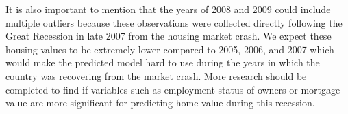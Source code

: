 It is also important to mention that the years of 2008 and 2009 could include multiple outliers because these observations were collected directly following the Great Recession in late 2007 from the housing market crash. We expect these housing values to be extremely lower compared to 2005, 2006, and 2007 which would make the predicted model hard to use during the years in which the country was recovering from the market crash. More research should be completed to find if variables such as employment status of owners or mortgage value are more significant for predicting home value during this recession.